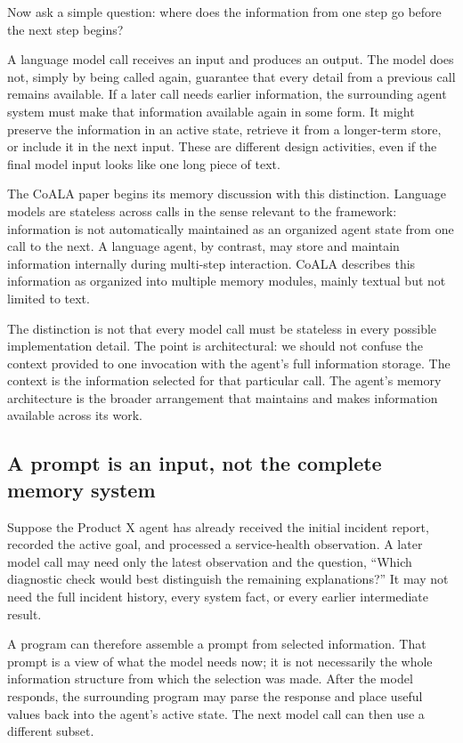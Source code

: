 Now ask a simple question: where does the information from one step go before the next step begins?

A language model call receives an input and produces an output. The model does not, simply by being called again, guarantee that every detail from a previous call remains available. If a later call needs earlier information, the surrounding agent system must make that information available again in some form. It might preserve the information in an active state, retrieve it from a longer-term store, or include it in the next input. These are different design activities, even if the final model input looks like one long piece of text.

The CoALA paper begins its memory discussion with this distinction. Language models are stateless across calls in the sense relevant to the framework: information is not automatically maintained as an organized agent state from one call to the next. A language agent, by contrast, may store and maintain information internally during multi-step interaction. CoALA describes this information as organized into multiple memory modules, mainly textual but not limited to text.

The distinction is not that every model call must be stateless in every possible implementation detail. The point is architectural: we should not confuse the context provided to one invocation with the agent's full information storage. The context is the information selected for that particular call. The agent's memory architecture is the broader arrangement that maintains and makes information available across its work.

\subsection{A prompt is an input, not the complete memory system}

Suppose the Product X agent has already received the initial incident report, recorded the active goal, and processed a service-health observation. A later model call may need only the latest observation and the question, ``Which diagnostic check would best distinguish the remaining explanations?'' It may not need the full incident history, every system fact, or every earlier intermediate result.

A program can therefore assemble a prompt from selected information. That prompt is a view of what the model needs now; it is not necessarily the whole information structure from which the selection was made. After the model responds, the surrounding program may parse the response and place useful values back into the agent's active state. The next model call can then use a different subset.

